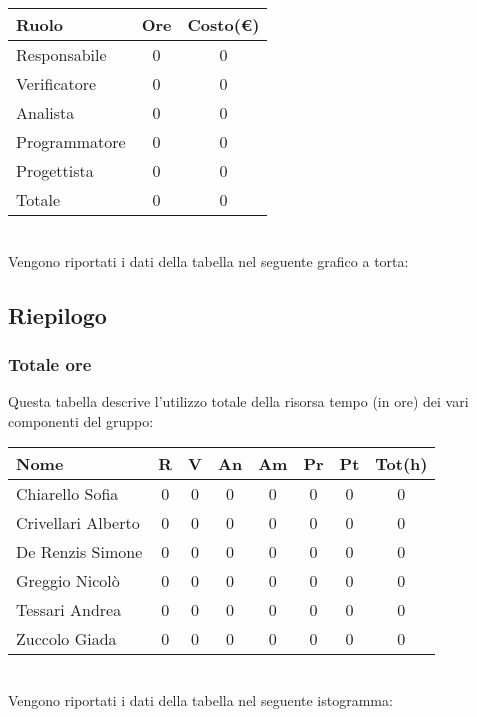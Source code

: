 \begin{tabular}{|l|c|c|}
\hline
Ruolo & Ore & Costo(€)\\
\hline
Responsabile & 0 & 0\\
Verificatore & 0 & 0\\
Analista & 0 & 0\\
Programmatore & 0 & 0\\
Progettista & 0 & 0\\
Totale & 0& 0\\
\hline
\end{tabular}\\


Vengono riportati i dati della tabella nel seguente grafico a torta: \\


\subsection{Riepilogo}

\subsubsection{Totale ore}

Questa tabella descrive l'utilizzo totale della risorsa tempo (in ore) dei vari componenti del gruppo: \\

\begin{tabular}{|l|cccccc|c|}
\hline
Nome & R &  V & An & Am & Pr & Pt & Tot(h)\\
\hline
Chiarello Sofia & 0 & 0 & 0 & 0 & 0 & 0 & 0\\
Crivellari Alberto & 0 & 0 & 0 & 0 & 0 & 0 & 0\\
De Renzis Simone & 0 & 0 & 0 & 0 & 0 & 0 & 0\\
Greggio Nicolò & 0 & 0 & 0 & 0 & 0 & 0 & 0\\
Tessari Andrea & 0 & 0 & 0 & 0 & 0 & 0 & 0\\
Zuccolo Giada & 0 & 0 & 0 & 0 & 0 & 0 & 0\\
\hline
\end{tabular}
\\
Vengono riportati i dati della tabella nel seguente istogramma: \\


